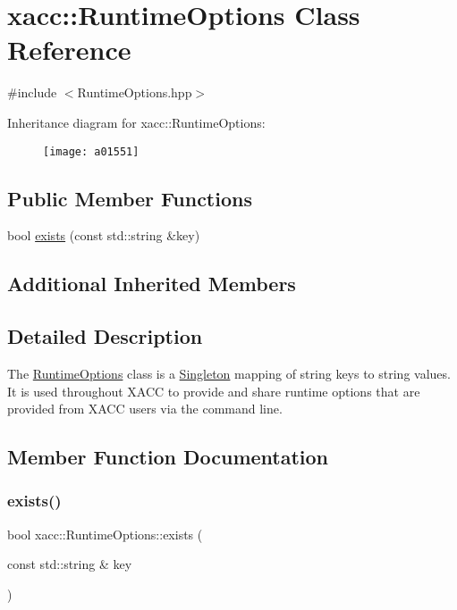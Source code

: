 \hypertarget{a01551}{}\section{xacc\+:\+:Runtime\+Options Class Reference}
\label{a01551}


{\ttfamily \#include $<$Runtime\+Options.\+hpp$>$}

Inheritance diagram for xacc\+:\+:Runtime\+Options\+:\begin{figure}[H]
\begin{center}
\leavevmode
\texttt{[image: a01551]}
\end{center}
\end{figure}
\subsection*{Public Member Functions}
\begin{DoxyCompactItemize}
\item 
bool \hyperlink{a01551_a3603aecb87461efedd0fabbef966c80c}{exists} (const std\+::string \&key)
\end{DoxyCompactItemize}
\subsection*{Additional Inherited Members}


\subsection{Detailed Description}
The \hyperlink{a01551}{Runtime\+Options} class is a \hyperlink{a01555}{Singleton} mapping of string keys to string values. It is used throughout X\+A\+CC to provide and share runtime options that are provided from X\+A\+CC users via the command line. 

\subsection{Member Function Documentation}
\mbox{\label{a01551_a3603aecb87461efedd0fabbef966c80c}} 
\subsubsection{\texorpdfstring{exists()}{exists()}}
{\footnotesize\ttfamily bool xacc\+::\+Runtime\+Options\+::exists (\begin{DoxyParamCaption}\item[{const std\+::string \&}]{key }\end{DoxyParamCaption})\hspace{0.3cm}{\ttfamily [inline]}}

